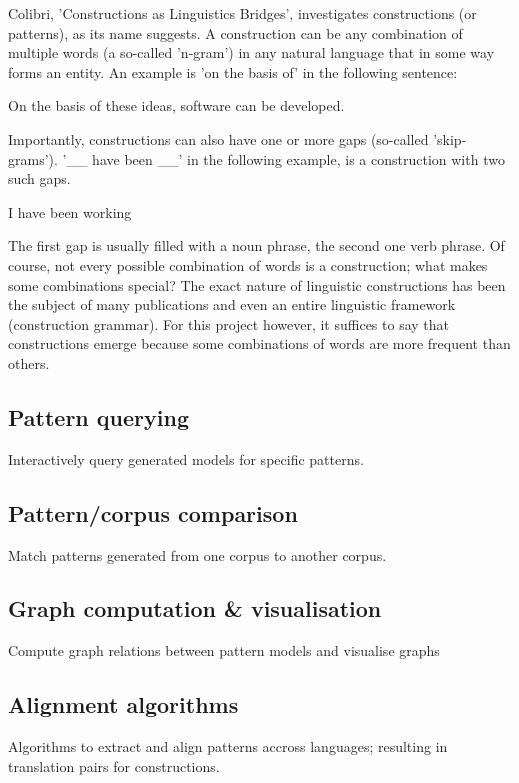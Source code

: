 \documentclass[12pt]{article}
\begin{document}
Colibri, 'Constructions as Linguistics Bridges', investigates constructions (or patterns), as its name suggests. A construction can be any combination of multiple words (a so-called 'n-gram') in any natural language that in some way forms an entity. An example is 'on the basis of' in the following sentence:

\begin{examples}
\item On the basis of these ideas, software can be developed.
\end{examples}

Importantly, constructions can also have one or more gaps (so-called 'skip-grams'). '\_\_ have been \_\_' in the following example, is a construction with two such gaps. 

\begin{examples}
\item I have been working
\end{examples}

The first gap is usually filled with a noun phrase, the second one verb phrase. Of course, not every possible combination of words is a construction; what makes some combinations special? The exact nature of linguistic constructions has been the subject of many publications and even an entire linguistic framework (construction grammar). For this project however, it suffices to say that constructions emerge because some combinations of words are more frequent than others.


\subsection{Pattern querying} Interactively query generated models for specific patterns.
\subsection{Pattern/corpus comparison} Match patterns generated from one corpus to another corpus.
\subsection{Graph computation \& visualisation} Compute graph relations between pattern models and visualise graphs
\subsection{Alignment algorithms} Algorithms to extract and align patterns accross languages; resulting in translation pairs for constructions.
\end{document}
